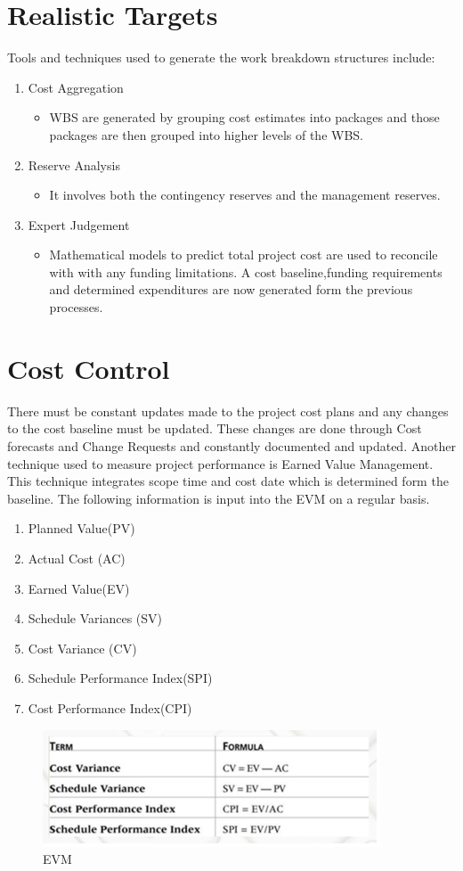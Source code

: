 \section{Realistic Targets}

Tools and techniques used to generate the work breakdown structures include:
\begin{enumerate}
\item Cost Aggregation 
\begin{itemize}
\item WBS are generated by grouping cost estimates into packages and those packages are then grouped into higher levels of the WBS.
\end{itemize}
\item Reserve Analysis
\begin{itemize}
\item It involves both the contingency reserves and the management reserves. 
\end{itemize}
\item Expert Judgement
\begin{itemize}
\item Mathematical models to predict total project cost are used to reconcile with with any funding limitations. A cost baseline,funding requirements and determined expenditures are now generated form the previous processes.
\end{itemize}
\end{enumerate}

\section{Cost Control}

There must be constant updates made to the project cost plans and any changes to the cost baseline must be updated. These changes are done through Cost forecasts and Change Requests and constantly documented and updated. 
Another technique used to measure project performance is Earned Value Management. This technique integrates scope time and cost date which is determined form the baseline. The following information is input into the EVM on a regular basis.

\begin{enumerate}
\item Planned Value(PV)
\item Actual Cost (AC)
\item Earned Value(EV)
\item Schedule Variances (SV)
\item Cost Variance (CV)
\item Schedule Performance Index(SPI)
\item Cost Performance Index(CPI)
\end{enumerate}

\begin{figure} [H]
\begin{center}
\includegraphics[scale=0.7]{evm.png}
\caption{EVM}
\label{fig:evm}
\end{center}
\end{figure}